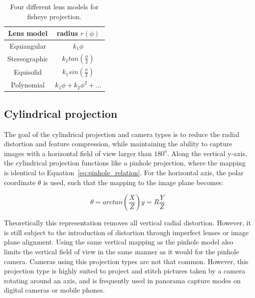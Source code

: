 \begin{table}[!htb]
    \centering
    \caption{Four different lens models for fisheye projection.}
    \label{tab:theory_fisheye_lens_model}
    \begin{tabular}{|c|c|} \hline
        Lens model & radius $r(\phi)$ \\ \hline
        Equiangular & $k_1\phi$\\ \hline
        Stereographic & $k_1 tan\left(\frac{\phi}{2}\right)$\\ \hline
        Equisolid & $k_1 sin\left(\frac{\phi}{2}\right)$\\ \hline 
        Polynomial & $k_1 \phi + k_2 \phi^2 + ...$\\ \hline
    \end{tabular}
\end{table}

\subsection{Cylindrical projection}

The goal of the cylindrical projection and camera types is to reduce the radial distortion and feature compression, while maintaining the ability to capture images with a horizontal field of view larger than $180^o$. Along the vertical y-axis, the cylindrical projection functions like a pinhole projection, where the mapping is identical to Equation~\eqref{eq:pinhole_relation}. For the horizontal axis, the polar coordinate $\theta$ is used, such that the mapping to the image plane becomes:

\begin{subequations}
\begin{equation}
    \theta = arctan\left(\frac{X}{Z}\right)
    \label{eq:cylindrical_theta}
\end{equation}
\begin{equation}
    y = R\frac{Y}{Z}
    \label{eq:cylindrical_y}
\end{equation}
\label{eq:cylindrical}
\end{subequations}

Theoretically this representation removes all vertical radial distortion. However, it is still subject to the introduction of distortion through imperfect lenses or image plane alignment. Using the same vertical mapping as the pinhole model also limits the vertical field of view in the same manner as it would for the pinhole camera. Cameras using this projection types are not that common. However, this projection type is highly suited to project and stitch pictures taken by a camera rotating around an axis, and is frequently used in panorama capture modes on digital cameras or mobile phones.

